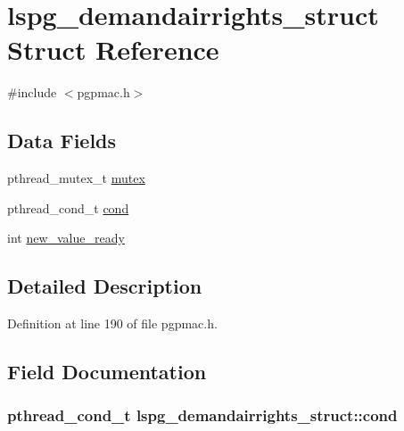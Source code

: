 \hypertarget{structlspg__demandairrights__struct}{\section{lspg\-\_\-demandairrights\-\_\-struct Struct Reference}
\label{structlspg__demandairrights__struct}
}


{\ttfamily \#include $<$pgpmac.\-h$>$}

\subsection*{Data Fields}
\begin{DoxyCompactItemize}
\item 
pthread\-\_\-mutex\-\_\-t \hyperlink{structlspg__demandairrights__struct_a874970af767d4bb329f9764075b30096}{mutex}
\item 
pthread\-\_\-cond\-\_\-t \hyperlink{structlspg__demandairrights__struct_addc1e3476a3f282a19b335f7875861d1}{cond}
\item 
int \hyperlink{structlspg__demandairrights__struct_ad686c9a04d0c7e10b236c234eaf03ce7}{new\-\_\-value\-\_\-ready}
\end{DoxyCompactItemize}


\subsection{Detailed Description}


Definition at line 190 of file pgpmac.\-h.



\subsection{Field Documentation}
\hypertarget{structlspg__demandairrights__struct_addc1e3476a3f282a19b335f7875861d1}{
\subsubsection[{cond}]{\setlength{\rightskip}{0pt plus 5cm}pthread\-\_\-cond\-\_\-t lspg\-\_\-demandairrights\-\_\-struct\-::cond}}\label{structlspg__demandairrights__struct_addc1e3476a3f282a19b335f7875861d1}


